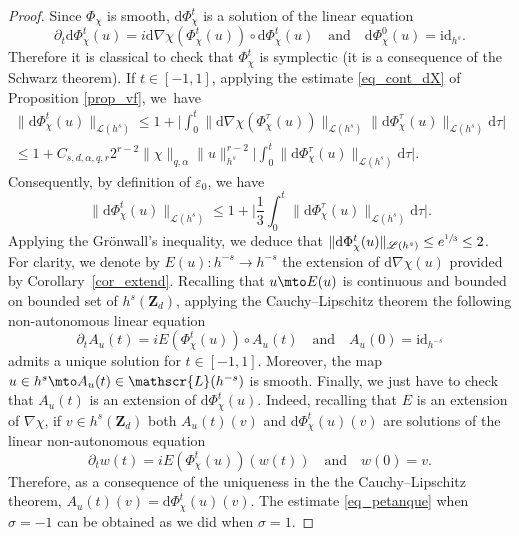 \begin{proof}
Since $\Phi_\chi$ is smooth, $\mathrm{d}\Phi_\chi^t$ is a solution of the linear equation
\begin{equation}
\label{eq_lin}
\partial_t \mathrm{d}\Phi_\chi^t(u) = i \mathrm{d}\nabla \chi(\Phi_\chi^t(u))\circ \mathrm{d}\Phi_\chi^t(u) \quad \text{and} \quad \mathrm{d}\Phi_\chi^0(u) = \mathrm{id}_{h^s}.
\end{equation}
Therefore it is classical to check that $\Phi_\chi^t$ is symplectic (it is a consequence of the Schwarz theorem). If $t\in [-1,1]$, applying the estimate \eqref{eq_cont_dX} of Proposition \ref{prop_vf}, we~have
\begin{multline*}
\| \mathrm{d}\Phi_\chi^t(u) \|_{\mathscr{L}(h^s)} \leq 1+ \biggl| \int_0^t \| \mathrm{d}\nabla \chi(\Phi_\chi^\tau(u)) \|_{\mathscr{L}(h^s)} \| \mathrm{d}\Phi_\chi^\tau(u) \|_{\mathscr{L}(h^s)} \mathrm{d}\tau \biggr| \\ \leq 1+ C_{s,d,\alpha,q,r} 2^{r-2} \|\chi \|_{q,\alpha} \|u\|_{h^s}^{r-2}\biggl| \int_0^t \| \mathrm{d}\Phi_\chi^\tau(u) \|_{\mathscr{L}(h^s)} \mathrm{d}\tau \biggr|.
\end{multline*}
Consequently, by definition of $\varepsilon_0$, we have
\[
\| \mathrm{d}\Phi_\chi^t(u) \|_{\mathscr{L}(h^s)} \leq 1+\biggl| \frac13 \int_0^t \| \mathrm{d}\Phi_\chi^\tau(u) \|_{\mathscr{L}(h^s)} \mathrm{d}\tau \biggr|.
\]
Applying the Grönwall's inequality, we deduce that
$\| \mathrm{d}\Phi_\chi^t(u) \|_{\mathscr{L}(h^s)} \leq e^{\sfrac13} \leq 2$.
For clarity, we denote by $E(u):h^{-s}\to h^{-s}$ the extension of $\mathrm{d}\nabla \chi(u)$ provided by Corollary~\ref{cor_extend}. Recalling that $u\mto E(u)$ is continuous and bounded on bounded set of $h^s(\mathbf{Z}_d)$, applying the Cauchy--Lipschitz theorem the following non-autonomous linear equation
\begin{equation*}
\partial_t A_u(t) = iE(\Phi_\chi^t(u))\circ A_u(t) \quad \text{and} \quad A_u(0) = \mathrm{id}_{h^{-s}}
\end{equation*}
admits a unique solution for $t\in [-1,1]$. Moreover, the map $u\in h^s \mto A_u(t) \in \mathscr{L}(h^{-s})$ is smooth. Finally, we just have to check that $A_u(t)$ is an extension of $\mathrm{d}\Phi_\chi^t(u)$. Indeed, recalling that $E$ is an extension of $\nabla \chi$, if $v\in h^s(\mathbf{Z}_d)$ both $A_u(t)(v)$ and $\mathrm{d}\Phi_\chi^t(u)(v)$ are solutions of the linear non-autonomous equation
\[
\partial_t w(t) = i E(\Phi_\chi^t(u))(w(t)) \quad \text{and} \quad w(0) = v.
\]
Therefore, as a consequence of the uniqueness in the the Cauchy--Lipschitz theorem, $A_u(t)(v) =\mathrm{d}\Phi_\chi^t(u)(v)$. The estimate \eqref{eq_petanque} when $\sigma=-1$ can be obtained as we did when $\sigma=1$.
\end{proof}

